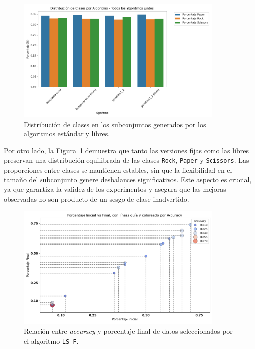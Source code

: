 \begin{figure}[htp]
    \centering
    \includegraphics[width=0.9\textwidth]{imagenes/evaluaciones/libres/distribucion-clases}
    \caption{Distribución de clases en los subconjuntos generados por los algoritmos estándar y libres.}
    \label{fig:distribucion_libres}
\end{figure}

Por otro lado, la Figura~\ref{fig:distribucion_libres} demuestra que tanto las versiones fijas como las libres preservan una
distribución equilibrada de las clases \texttt{Rock}, \texttt{Paper} y \texttt{Scissors}.
Las proporciones entre clases se mantienen estables, sin que la flexibilidad en el tamaño del subconjunto genere desbalances significativos.
Este aspecto es crucial, ya que garantiza la validez de los experimentos y asegura que las mejoras observadas no son producto de un sesgo de clase inadvertido.


\begin{figure}[htp]
    \centering
    \includegraphics[width=0.9\textwidth]{imagenes/evaluaciones/libres/scatter_lr-f}
    \caption{Relación entre \textit{accuracy} y porcentaje final de datos seleccionados por el algoritmo \texttt{LS-F}.}
    \label{fig:scatter_bl_f}
\end{figure}

